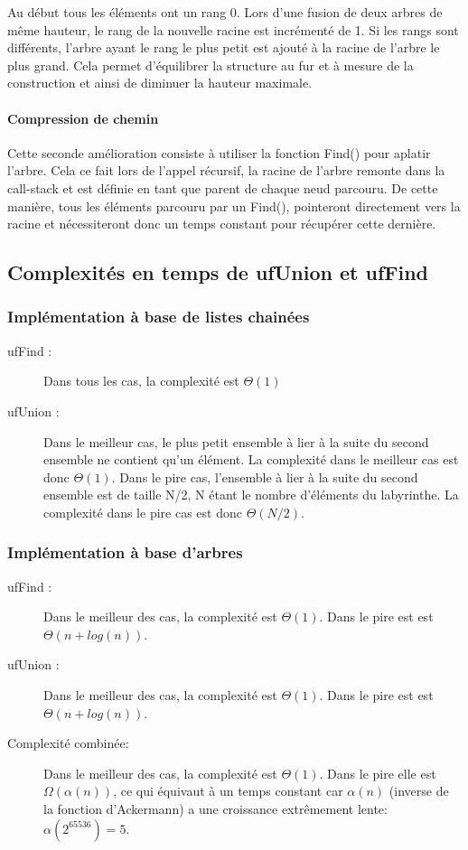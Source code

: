 \documentclass[11pt]{article}
\begin{document}
	Au début tous les éléments ont un rang 0. Lors d'une fusion de deux arbres de même hauteur, le rang de la nouvelle racine est incrémenté de 1. Si les rangs sont différents, l'arbre ayant le rang le plus petit est ajouté à la racine de l'arbre le plus grand. Cela permet d'équilibrer la structure au fur et à mesure de la construction et ainsi de diminuer la hauteur maximale.
	
	\paragraph{Compression de chemin}
	Cette seconde amélioration consiste à utiliser la fonction Find() pour aplatir l'arbre. Cela ce fait lors de l'appel récursif, la racine de l'arbre remonte dans la call-stack et est définie en tant que parent de chaque neud parcouru. De cette manière, tous les éléments parcouru par un Find(), pointeront directement vers la racine et nécessiteront donc un temps constant pour récupérer cette dernière.

\subsection{Complexités en temps de ufUnion et ufFind}

\subsubsection{Implémentation à base de listes chainées}

\begin{description}
\item[ufFind :] Dans tous les cas, la complexité est $\Theta(1)$
\item[ufUnion :] Dans le meilleur cas, le plus petit ensemble à lier à la suite du second ensemble ne contient qu'un élément. La complexité dans le meilleur cas est donc $\Theta(1)$. Dans le pire cas, l'ensemble à lier à la suite du second ensemble est de taille N/2, N étant le nombre d'éléments du labyrinthe. La complexité dans le pire cas est donc $\Theta(N/2)$.
\end{description}
\subsubsection{Implémentation à base d'arbres}
\begin{description}
\item[ufFind :] Dans le meilleur des cas, la complexité est $\Theta(1)$. Dans le pire est est $\Theta(n + log(n))$. 
\item[ufUnion :] Dans le meilleur des cas, la complexité est $\Theta(1)$. Dans le pire est est $\Theta(n + log(n))$.
\item[Complexité combinée:] Dans le meilleur des cas, la complexité est $\Theta(1)$. Dans le pire elle est $\Omega( \alpha(n))$, ce qui équivaut à un temps constant car $\alpha(n)$ (inverse de la fonction d'Ackermann) a une croissance extrêmement lente: $\alpha(2^{65536}) = 5$.
\end{description}
\end{document}
